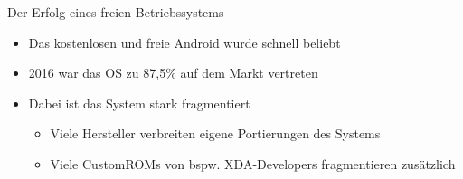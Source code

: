 \begin{frame}{Der Erfolg eines freien Betriebssystems}
	\begin{itemize}[<+->]
		\item Das kostenlosen und freie Android wurde schnell beliebt
		\item 2016 war das OS zu 87,5\% auf dem Markt vertreten
		\item Dabei ist das System stark fragmentiert
		\begin{itemize}
			\item Viele Hersteller verbreiten eigene Portierungen des Systems
			\item Viele CustomROMs von bspw. XDA-Developers fragmentieren zusätzlich 
		\end{itemize}
	\end{itemize}
\end{frame}